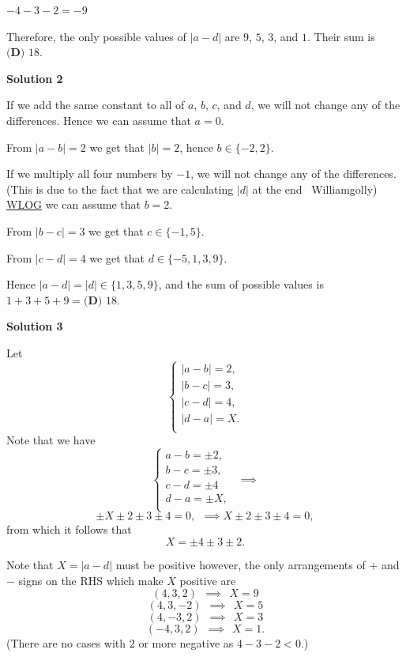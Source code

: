 \begin{enumerate}
 $-4-3-2=-9$

 Therefore, the only possible values of $|a-d|$ are $9$, $5$, $3$, and $1$. Their sum is $\boxed{\textbf{(D) } 18}$.

 



\textbf{Solution 2}

If we add the same constant to all of $a$, $b$, $c$, and $d$, we will not change any of the differences. Hence we can assume that $a=0$.

 From $|a-b|=2$ we get that $|b|=2$, hence $b\in\{-2,2\}$.

 If we multiply all four numbers by $-1$, we will not change any of the differences. (This is due to the fact that we are calculating $|d|$ at the end ~Williamgolly) \href{https://artofproblemsolving.com/wiki/index.php?title=WLOG}{WLOG} we can assume that $b=2$.

 From $|b-c|=3$ we get that $c\in\{-1,5\}$.

 From $|c-d|=4$ we get that $d\in\{-5,1,3,9\}$.

 Hence $|a-d|=|d|\in\{1,3,5,9\}$, and the sum of possible values is $1+3+5+9 = \boxed{\textbf{(D) }18}$.

 



\textbf{Solution 3}

Let 
 \[\begin{cases} |a-b| = 2, \\ |b-c| = 3, \\ |c-d| = 4, \\ |d-a| = X. \\ \end{cases}\] Note that we have 
 \[\begin{cases} a-b = \pm 2, \\ b-c = \pm 3, \\ c-d = \pm 4 \\ d-a = \pm X, \\ \end{cases} \ \ \implies\] 
 \[\pm X \pm 2 \pm 3 \pm 4 = 0, \ \ \implies X \pm 2 \pm 3 \pm 4 = 0,\] from which it follows that 
 \[X = \pm 4 \pm 3 \pm 2.\]

 Note that $X = |a-d|$ must be positive however, the only arrangements of $+$ and $-$ signs on the RHS which make $X$ positive are 
 \[(4, 3, 2) \ \ \implies \ \ X = 9\] 
 \[(4, 3, -2) \ \ \implies \ \ X = 5\] 
 \[(4, -3, 2) \ \ \implies \ \ X = 3\] 
 \[(-4, 3, 2) \ \ \implies \ \ X = 1.\] (There are no cases with $2$ or more negative as $4-3-2<0.$)


\end{enumerate}
